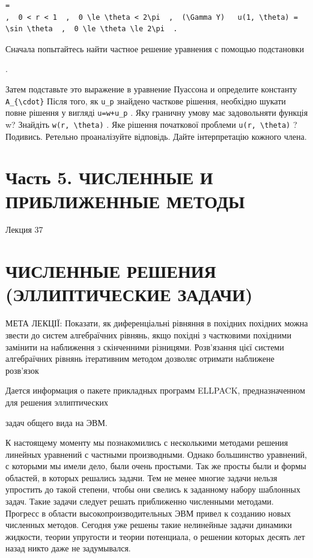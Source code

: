 \documentclass[
  ukrainian,
]{article}
\begin{document}
\begin{verbatim}
=
,  0 < r < 1  ,  0 \le \theta < 2\pi  ,  (\Gamma Y)   u(1, \theta) = \sin \theta  ,  0 \le \theta \le 2\pi  .
\end{verbatim}

Сначала попытайтесь найти частное решение уравнения с помощью
подстановки

.

Затем подставьте это выражение в уравнение Пуассона и определите
константу \texttt{A\_\{\textbackslash{}cdot\}} Після того, як
\texttt{u\_p} знайдено часткове рішення, необхідно шукати повне рішення
у вигляді \texttt{u=w+u\_p} . Яку граничну умову має задовольняти
функція w? Знайдіть \texttt{w(r,\ \textbackslash{}theta)} . Яке рішення
початкової проблеми \texttt{u(r,\ \textbackslash{}theta)} ? Подивись.
Ретельно проаналізуйте відповідь. Дайте інтерпретацію кожного члена.

\section{Часть 5. ЧИСЛЕННЫЕ И ПРИБЛИЖЕННЫЕ
МЕТОДЫ}\label{ux447ux430ux441ux442ux44c-5.-ux447ux438ux441ux43bux435ux43dux43dux44bux435-ux438-ux43fux440ux438ux431ux43bux438ux436ux435ux43dux43dux44bux435-ux43cux435ux442ux43eux434ux44b}

Лекция 37

\section{ЧИСЛЕННЫЕ РЕШЕНИЯ (ЭЛЛИПТИЧЕСКИЕ
ЗАДАЧИ)}\label{ux447ux438ux441ux43bux435ux43dux43dux44bux435-ux440ux435ux448ux435ux43dux438ux44f-ux44dux43bux43bux438ux43fux442ux438ux447ux435ux441ux43aux438ux435-ux437ux430ux434ux430ux447ux438}

МЕТА ЛЕКЦІЇ: Показати, як диференціальні рівняння в похідних похідних
можна звести до систем алгебраїчних рівнянь, якщо похідні з частковими
похідними замінити на наближення з скінченними різницями. Розв'язання
цієї системи алгебраїчних рівнянь ітеративним методом дозволяє отримати
наближене розв'язок

Дается информация о пакете прикладных программ ELLPACK, предназначенном
для решения эллиптических

задач общего вида на ЭВМ.

К настоящему моменту мы познакомились с несколькими методами решения
линейных уравнений с частными производными. Однако большинство
уравнений, с которыми мы имели дело, были очень простыми. Так же просты
были и формы областей, в которых решались задачи. Тем не менее многие
задачи нельзя упростить до такой степени, чтобы они свелись к заданному
набору шаблонных задач. Такие задачи следует решать приближенно
численными методами. Прогресс в области высокопроизводительных ЭВМ
привел к созданию новых численных методов. Сегодня уже решены такие
нелинейные задачи динамики жидкости, теории упругости и теории
потенциала, о решении которых десять лет назад никто даже не
задумывался.
\end{document}
